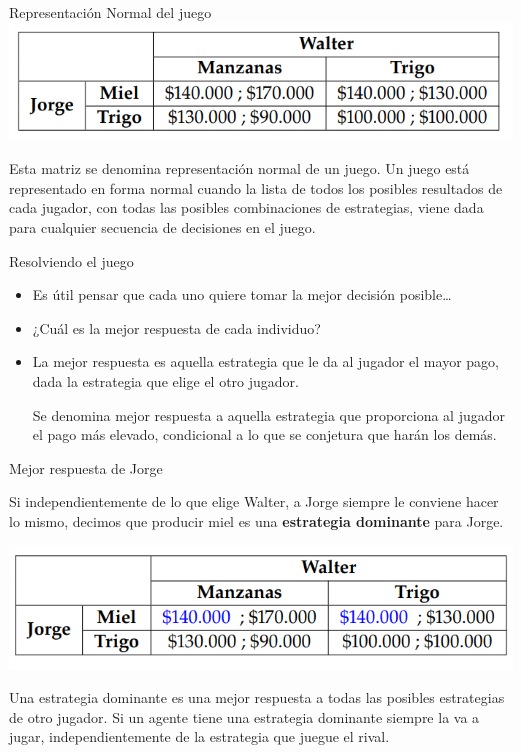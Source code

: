 \documentclass{beamer}
\begin{document}
\begin{frame}{Representación Normal del juego}
    \centering
    \includegraphics[scale=0.6]{../Figures/T20.2.png}
    \begin{boxA}
        \centering
        Esta matriz se denomina representación normal de un juego. Un
juego está representado en forma normal cuando la lista de todos
los posibles resultados de cada jugador, con todas las posibles
combinaciones de estrategias, viene dada para cualquier secuencia
de decisiones en el juego.
    \end{boxA}
\end{frame}

\begin{frame}{Resolviendo el juego}
    
    \begin{itemize}
        \item Es útil pensar que cada uno quiere tomar la mejor decisión posible\dots
        \item ¿Cuál es la mejor respuesta de cada individuo?
        \item La mejor respuesta es aquella estrategia que le da al jugador el mayor pago, dada la estrategia que elige el otro jugador.
        \begin{boxA}
            \centering
            Se denomina mejor respuesta a aquella estrategia que proporciona al jugador el pago más elevado, condicional a lo que se conjetura que harán los demás.
        \end{boxA}
    \end{itemize}
\end{frame}

\begin{frame}{Mejor respuesta de Jorge}
    
    Si independientemente de lo que elige Walter, a Jorge siempre le conviene hacer lo mismo, decimos que producir miel es una \textbf{estrategia dominante} para Jorge.
    
    \centering
    \includegraphics[scale=0.6]{../Figures/T20.3.png}

    \begin{boxA}
        \centering
        Una estrategia dominante es una mejor respuesta a todas las posibles estrategias de otro jugador. Si un agente tiene una estrategia dominante siempre la va a jugar, independientemente de la estrategia que juegue el rival.
    \end{boxA}
\end{frame}
\end{document}

